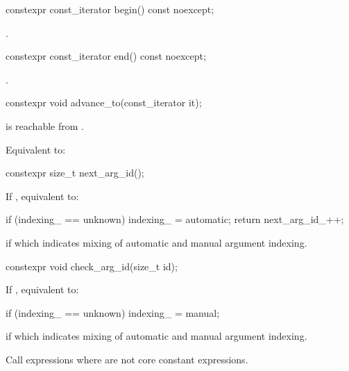%
\begin{itemdecl}
constexpr const_iterator begin() const noexcept;
\end{itemdecl}

\begin{itemdescr}
\pnum
\returns
{}.
\end{itemdescr}

%
\begin{itemdecl}
constexpr const_iterator end() const noexcept;
\end{itemdecl}

\begin{itemdescr}
\pnum
\returns
{}.
\end{itemdescr}

%
\begin{itemdecl}
constexpr void advance_to(const_iterator it);
\end{itemdecl}

\begin{itemdescr}
\pnum
\expects
{} is reachable from .

\pnum
\effects
Equivalent to: 
\end{itemdescr}

%
\begin{itemdecl}
constexpr size_t next_arg_id();
\end{itemdecl}

\begin{itemdescr}
\pnum
\effects
If , equivalent to:
\begin{codeblock}
if (indexing_ == unknown)
  indexing_ = automatic;
return next_arg_id_++;
\end{codeblock}

\pnum
\throws
{} if 
which indicates mixing of automatic and manual argument indexing.
\end{itemdescr}

%
\begin{itemdecl}
constexpr void check_arg_id(size_t id);
\end{itemdecl}

\begin{itemdescr}
\pnum
\effects
If , equivalent to:
\begin{codeblock}
if (indexing_ == unknown)
  indexing_ = manual;
\end{codeblock}

\pnum
\throws
{} if
 which indicates mixing of automatic and
manual argument indexing.

\pnum
\remarks
Call expressions where  are not
core constant expressions.
\end{itemdescr}

